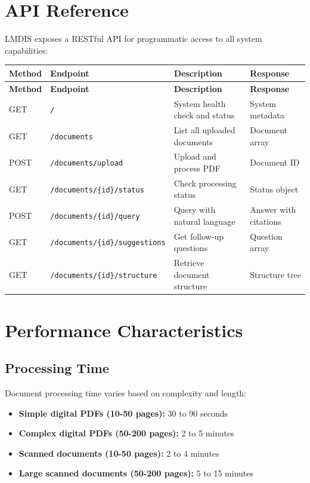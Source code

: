 \documentclass[11pt,a4paper]{article}
\begin{document}
\clearpage
\section{API Reference}

LMDIS exposes a RESTful API for programmatic access to all system capabilities:

\begin{longtable}{@{}llp{5cm}p{3cm}@{}}
\toprule
\textbf{Method} & \textbf{Endpoint} & \textbf{Description} & \textbf{Response} \\
\midrule
\endfirsthead

\toprule
\textbf{Method} & \textbf{Endpoint} & \textbf{Description} & \textbf{Response} \\
\midrule
\endhead

\bottomrule
\endfoot

GET & \texttt{/} & System health check and status & System metadata \\
GET & \texttt{/documents} & List all uploaded documents & Document array \\
POST & \texttt{/documents/upload} & Upload and process PDF & Document ID \\
GET & \texttt{/documents/\{id\}/status} & Check processing status & Status object \\
POST & \texttt{/documents/\{id\}/query} & Query with natural language & Answer with citations \\
GET & \texttt{/documents/\{id\}/suggestions} & Get follow-up questions & Question array \\
GET & \texttt{/documents/\{id\}/structure} & Retrieve document structure & Structure tree \\

\end{longtable}

\clearpage
\section{Performance Characteristics}

\subsection{Processing Time}

Document processing time varies based on complexity and length:

\begin{itemize}[leftmargin=*]
    \item \textbf{Simple digital PDFs (10-50 pages):} 30 to 90 seconds
    \item \textbf{Complex digital PDFs (50-200 pages):} 2 to 5 minutes
    \item \textbf{Scanned documents (10-50 pages):} 2 to 4 minutes
    \item \textbf{Large scanned documents (50-200 pages):} 5 to 15 minutes
\end{itemize}
\end{document}
